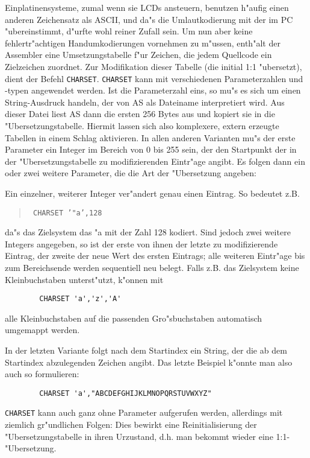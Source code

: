 \documentclass[12pt,a4paper,twoside]{report}
\newcommand{\tty}[1]{{\tt #1}}
\begin{document}
Einplatinensysteme, zumal wenn sie LCDs ansteuern, benutzen h"aufig
einen anderen Zeichensatz als ASCII, und da"s die Umlautkodierung mit
der im PC "ubereinstimmt, d"urfte wohl reiner Zufall sein.  Um nun
aber keine fehlertr"achtigen Handumkodierungen vornehmen zu m"ussen,
enth"alt der Assembler eine Umsetzungstabelle f"ur Zeichen, die jedem
Quellcode ein Zielzeichen zuordnet.  Zur Modifikation dieser Tabelle
(die initial 1:1 "ubersetzt), dient der Befehl \tty{CHARSET}. 
\tty{CHARSET} kann mit verschiedenen Parameterzahlen und -typen angewendet
werden.  Ist die Parameterzahl eins, so mu"s es sich um einen
String-Ausdruck handeln, der von AS als Dateiname interpretiert wird.  Aus
dieser Datei liest AS dann die ersten 256 Bytes aus und kopiert sie in die
"Ubersetzungstabelle.  Hiermit lassen sich also komplexere, extern
erzeugte Tabellen in einem Schlag aktivieren.  In allen anderen Varianten
mu"s der erste Parameter ein Integer im Bereich von 0 bis 255 sein, der
den Startpunkt der in der "Ubersetzungstabelle zu modifizierenden
Eintr"age angibt.  Es folgen dann ein oder zwei weitere Parameter, die die
Art der "Ubersetzung angeben:

Ein einzelner, weiterer Integer ver"andert genau einen Eintrag.  So
bedeutet z.B. 
\begin{quote}{\tt
        CHARSET '"a',128}
\end{quote}
da"s das Zielsystem das "a mit der Zahl 128 kodiert.  Sind jedoch zwei
weitere Integers angegeben, so ist der erste von ihnen der letzte zu
modifizierende Eintrag, der zweite der neue Wert des ersten Eintrags; alle
weiteren Eintr"age bis zum Bereichsende werden sequentiell neu belegt.
Falls z.B. das Zielsystem keine Kleinbuchstaben unterst"utzt, k"onnen mit
\begin{verbatim}
        CHARSET 'a','z','A'
\end{verbatim}
alle Kleinbuchstaben auf die passenden Gro"sbuchstaben automatisch
umgemappt werden.

In der letzten Variante folgt nach dem Startindex ein String, der die ab
dem Startindex abzulegenden Zeichen angibt.  Das letzte Beispiel k"onnte
man also auch so formulieren:
\begin{verbatim}
        CHARSET 'a',"ABCDEFGHIJKLMNOPQRSTUVWXYZ"
\end{verbatim}

\tty{CHARSET} kann auch ganz ohne Parameter aufgerufen werden, allerdings
mit ziemlich gr"undlichen Folgen: Dies bewirkt eine Reinitialisierung der
"Ubersetzungstabelle in ihren Urzustand, d.h. man bekommt wieder eine
1:1-"Ubersetzung.
\end{document}
